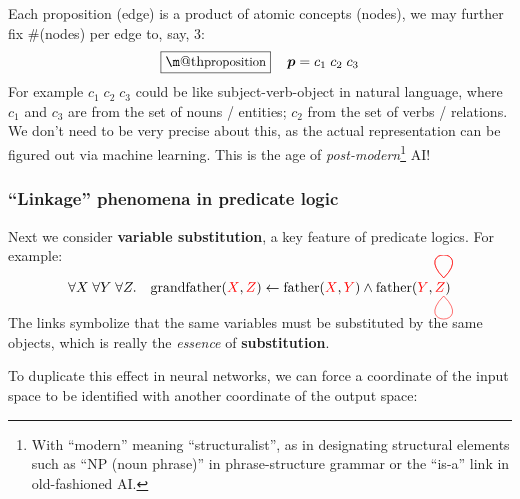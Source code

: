 \documentclass[orivec]{llncs}
\makeatletter
\newcommand{\vect}[1]{\boldsymbol{#1}}
\newcommand{\tikzmark}[1]{\tikz[overlay,remember picture] \node (#1) {};}
\renewcommand{\boxed}[1]{\fbox{\m@th$\displaystyle\scalebox{0.9}{#1}$} \,}
\makeatother
\begin{document}
Each proposition (edge) is a product of atomic concepts (nodes), we may further fix \#(nodes) per edge to, say, 3:
\begin{equation}
\boxed{\mbox{proposition}} \quad \vect{p} = c_1 \; c_2 \; c_3
\end{equation}
For example $c_1 \; c_2 \; c_3$ could be like subject-verb-object in natural language, where $c_1$ and $c_3$ are from the set of nouns / entities;  $c_2$ from the set of verbs / relations.  We don't need to be very precise about this, as the actual representation can be figured out via machine learning.  This is the age of \textit{post-modern}\footnote{With ``modern'' meaning ``structuralist'', as in designating structural elements such as ``NP (noun phrase)'' in phrase-structure grammar or the ``is-a'' link in old-fashioned AI.} AI!

\subsubsection{``Linkage'' phenomena in predicate logic}

Next we consider \textbf{variable substitution}, a key feature of predicate logics.  For example:

\begin{equation}
\forall X \; \forall Y \; \forall Z.  \quad  \text{grandfather}({\color{red}X} \tikzmark{x}, {\color{red}Z} \tikzmark{z}) \leftarrow \text{father}({\color{red}X} \tikzmark{p}, {\color{red}Y} \tikzmark{y}) \wedge \mbox{father}({\color{red}Y} \tikzmark{q}, {\color{red}Z} \tikzmark{r})
\begin{tikzpicture}[overlay,remember picture,out=45,in=135,distance=1.1cm]
  \draw[-,red, transform canvas={shift={(-5pt,10pt)}}] (x.center) to (p.center);
  \draw[-,red, transform canvas={shift={(-5pt,10pt)}}] (y.center) to (q.center);
  \draw[-,red, transform canvas={shift={(-5pt,-3pt)}}, out=-45,in=225] (z.center) to (r.center);
\end{tikzpicture}
\label{linkage-father}
\end{equation}

The links symbolize that the same variables must be substituted by the same objects, which is really the \textit{essence} of \textbf{substitution}.

To duplicate this effect in neural networks, we can force a coordinate of the input space to be identified with another coordinate of the output space:
\end{document}
